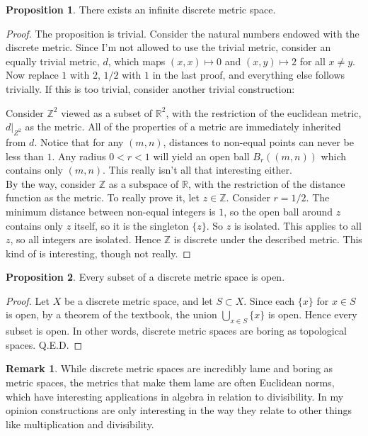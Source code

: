 \documentclass[11pt]{article}
\newcommand{\R}{\mathbb{R}}
\newcommand{\Z}{\mathbb{Z}}
\theoremstyle{definition}
\newtheorem{proposition}{Proposition}
\newtheorem{remark}{Remark}
\begin{document}
\begin{proposition}
There exists an infinite discrete metric space.
\end{proposition}
\begin{proof}
The proposition is trivial. Consider the natural numbers endowed with the discrete metric. Since I'm not allowed to use the trivial metric, consider an equally trivial metric, $d$, which maps $(x,x) \mapsto 0$ and $(x,y) \mapsto 2$ for all $x\ne y$. Now replace $1$ with $2$, $1/2$ with $1$ in the last proof, and everything else follows trivially. If this is too trivial, consider another trivial construction:

Consider $\Z^2$ viewed as a subset of $\R^2$, with the restriction of the euclidean metric, $d|_{Z^2}$ as the metric. All of the properties of a metric are immediately inherited from $d$. Notice that for any $(m,n)$, distances to non-equal points can never be less than $1$. Any radius $0<r<1$ will yield an open ball $B_r((m,n))$ which contains only $(m,n)$. This really isn't all that interesting either. \\

By the way, consider $\Z$ as a subspace of $\R$, with the restriction of the distance function as the metric. To really prove it, let $z\in \Z$. Consider $r = 1/2$. The minimum distance between non-equal integers is $1$, so the open ball around $z$ contains only $z$ itself, so it is the singleton $\{z\}.$ So $z$ is isolated. This applies to all $z$, so all integers are isolated. Hence $\Z$ is discrete under the described metric. This kind of is interesting, though not really.
\end{proof}

\begin{proposition}
Every subset of a discrete metric space is open.
\end{proposition}

\begin{proof}
Let $X$ be a discrete metric space, and let $S\subset X$. Since each $\{x\}$ for $x\in S$ is open, by a theorem of the textbook, the union $\bigcup_{x\in S}\{x\}$ is open. Hence every subset is open. In other words, discrete metric spaces are boring as topological spaces. Q.E.D.
\end{proof}

\begin{remark}
While discrete metric spaces are incredibly lame and boring as metric spaces, the metrics that make them lame are often Euclidean norms, which have interesting applications in algebra in relation to divisibility. In my opinion constructions are only interesting in the way they relate to other things like multiplication and divisibility. 
\end{remark}
\end{document}
